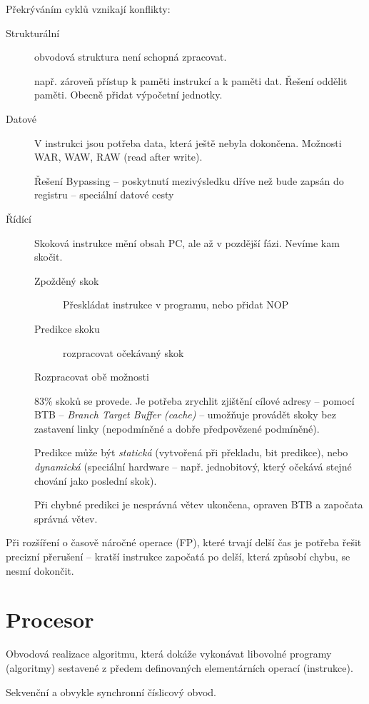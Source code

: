 \documentclass[a4paper, 11pt]{report}
\begin{document}
Překrýváním cyklů vznikají konflikty:
\begin{description}
	\item[Strukturální] obvodová struktura není schopná zpracovat.
	
	např. zároveň přístup k paměti instrukcí a k paměti dat. Řešení oddělit paměti. Obecně přidat výpočetní jednotky.
	
	\item[Datové] V instrukci jsou potřeba data, která ještě nebyla dokončena. Možnosti WAR, WAW, RAW (read after write).
	
	Řešení Bypassing -- poskytnutí mezivýsledku dříve než bude zapsán do registru -- speciální datové cesty
	
	\item[Řídící] Skoková instrukce mění obsah PC, ale až v pozdější fázi. Nevíme kam skočit.
	\begin{description}
		\item[Zpožděný skok] Přeskládat instrukce v programu, nebo přidat NOP
		\item[Predikce skoku] rozpracovat očekávaný skok
		\item[Rozpracovat obě možnosti]
	\end{description}
	
	83\% skoků se provede. Je potřeba zrychlit zjištění cílové adresy -- pomocí BTB -- \emph{Branch Target Buffer (cache)} -- umožňuje provádět skoky bez zastavení linky (nepodmíněné a dobře předpovězené podmíněné).
	
	Predikce může být \emph{statická} (vytvořená při překladu, bit predikce), nebo \emph{dynamická} (speciální hardware -- např. jednobitový, který očekává stejné chování jako poslední skok). 
	
	Při chybné predikci je nesprávná větev ukončena, opraven BTB a započata správná větev.
\end{description}

Při rozšíření o časově náročné operace (FP), které trvají delší čas je potřeba řešit precizní přerušení -- kratší instrukce započatá po delší, která způsobí chybu, se nesmí dokončit.

\section{Procesor}
Obvodová realizace algoritmu, která dokáže vykonávat libovolné programy (algoritmy) sestavené z předem definovaných elementárních operací (instrukce).

Sekvenční a obvykle synchronní číslicový obvod.
\end{document}
